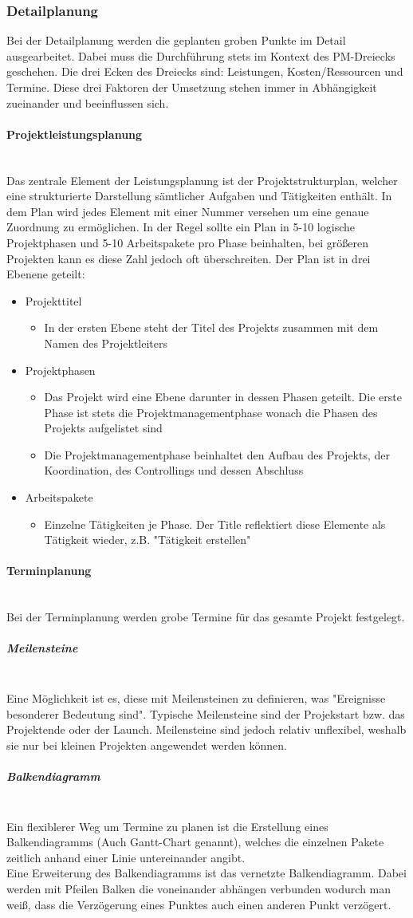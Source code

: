 \documentclass{article}
\newcommand{\paragraphlb}[1]{\paragraph{#1}\mbox{}\\}
\newcommand{\subparagraphlb}[1]{\subparagraph{#1}\mbox{}\\}
\begin{document}
	\subsubsection{Detailplanung}
	Bei der Detailplanung werden die geplanten groben Punkte im Detail ausgearbeitet. Dabei muss die Durchführung stets im Kontext des PM-Dreiecks geschehen. Die drei Ecken des Dreiecks sind: Leistungen, Kosten/Ressourcen und Termine. Diese drei Faktoren der Umsetzung stehen immer in Abhängigkeit zueinander und beeinflussen sich.
	\paragraphlb{Projektleistungsplanung}
	Das zentrale Element der Leistungsplanung ist der Projektstrukturplan, welcher eine strukturierte Darstellung sämtlicher Aufgaben und Tätigkeiten enthält. In dem Plan wird jedes Element mit einer Nummer versehen um eine genaue Zuordnung zu ermöglichen. In der Regel sollte ein Plan in 5-10 logische Projektphasen und 5-10 Arbeitspakete pro Phase beinhalten, bei größeren Projekten kann es diese Zahl jedoch oft überschreiten. Der Plan ist in drei Ebenene geteilt:
	\begin{itemize}
		\item{Projekttitel}
		\begin{itemize}
			\item{In der ersten Ebene steht der Titel des Projekts zusammen mit dem Namen des Projektleiters}
		\end{itemize}
		\item{Projektphasen}
		\begin{itemize}
			\item{Das Projekt wird eine Ebene darunter in dessen Phasen geteilt. Die erste Phase ist stets die Projektmanagementphase wonach die Phasen des Projekts aufgelistet sind}
			\item{Die Projektmanagementphase beinhaltet den Aufbau des Projekts, der Koordination, des Controllings und dessen Abschluss}
		\end{itemize}
		\item{Arbeitspakete}
		\begin{itemize}
			\item{Einzelne Tätigkeiten je Phase. Der Title reflektiert diese Elemente als Tätigkeit wieder, z.B. "Tätigkeit erstellen"}
		\end{itemize}
	\end{itemize}
	\paragraphlb{Terminplanung}
	Bei der Terminplanung werden grobe Termine für das gesamte Projekt festgelegt. 
	\subparagraphlb{Meilensteine}
	Eine Möglichkeit ist es, diese mit Meilensteinen zu definieren, was "Ereignisse besonderer Bedeutung sind". Typische Meilensteine sind der Projekstart bzw. das Projektende oder der Launch. Meilensteine sind jedoch relativ unflexibel, weshalb sie nur bei kleinen Projekten angewendet werden können.
	\subparagraphlb{Balkendiagramm}
	Ein flexiblerer Weg um Termine zu planen ist die Erstellung eines Balkendiagramms (Auch Gantt-Chart genannt), welches die einzelnen Pakete zeitlich anhand einer Linie untereinander angibt. \\
	Eine Erweiterung des Balkendiagramms ist das vernetzte Balkendiagramm. Dabei werden mit Pfeilen Balken die voneinander abhängen verbunden wodurch man weiß, dass die Verzögerung eines Punktes auch einen anderen Punkt verzögert.
\end{document}
